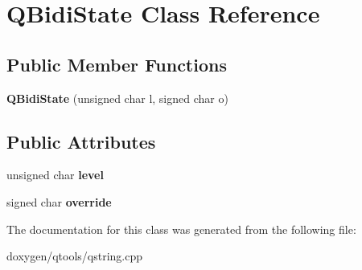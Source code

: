 \hypertarget{class_q_bidi_state}{}\section{Q\+Bidi\+State Class Reference}
\label{class_q_bidi_state}
\subsection*{Public Member Functions}
\begin{DoxyCompactItemize}
\item 
\mbox{\label{class_q_bidi_state_a2aee02dfa41be349fe6a38075b92feef}} 
{\bfseries Q\+Bidi\+State} (unsigned char l, signed char o)
\end{DoxyCompactItemize}
\subsection*{Public Attributes}
\begin{DoxyCompactItemize}
\item 
\mbox{\label{class_q_bidi_state_aa4a2250e5e3464d073acbdd50b8bd70b}} 
unsigned char {\bfseries level}
\item 
\mbox{\label{class_q_bidi_state_a804b38317c22cbe9f4b548366a010e29}} 
signed char {\bfseries override}
\end{DoxyCompactItemize}


The documentation for this class was generated from the following file\+:\begin{DoxyCompactItemize}
\item 
doxygen/qtools/qstring.\+cpp\end{DoxyCompactItemize}

